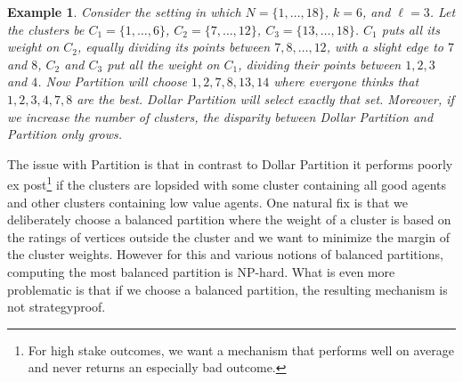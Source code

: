 \documentclass[letterpaper]{article}
\newtheorem{example}[theorem]{Example}
\begin{document}
\begin{example}
Consider the setting in which	$N=\{1,\ldots, 18\}$, $k=6$, and $\ell=3$. Let the clusters be $C_1=\{1,\ldots, 6\}$, $C_2=\{7,\ldots, 12\}$, $C_3=\{13,\ldots, 18\}$. $C_1$ puts all its weight on $C_2$, equally dividing its points between $7,8,\ldots,12$, with a slight edge to $7$ and $8$, $C_2$ and $C_3$ put all the weight on $C_1$, dividing their points between $1,2,3$ and $4$. Now Partition will choose $1,2,7,8,13,14$ where everyone thinks that $1,2,3,4,7,8$ are the best. Dollar Partition will select exactly that set. Moreover, if we increase the number of clusters, the disparity between Dollar Partition and Partition only grows.
	\end{example}

The issue with Partition is that in contrast to Dollar Partition it performs poorly ex post\footnote{For high stake outcomes, we want a mechanism that performs well on average and never returns an especially bad outcome.} if the clusters are lopsided with some cluster containing all good agents and other clusters containing low value agents. One natural fix is that we deliberately choose a balanced partition where the weight of a cluster is based on the ratings of vertices outside the cluster and we want to minimize the margin of the cluster weights.
However for this and various notions of balanced partitions, computing the most balanced partition is NP-hard. What is even more problematic is that if we choose a balanced partition, the resulting mechanism is not strategyproof.%
\end{document}
